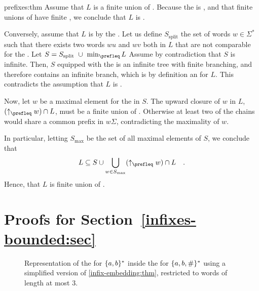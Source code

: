 \begin{proofof}{prefixes:thm}
    Assume that $L$ is a finite union of .
    Because the  is ,
    and that finite unions of  have finite ,
    we conclude that $L$ is .
    
    Conversely, assume that $L$ is  by the . Let us define $S_{\mathrm{split}}$ the set of words $w \in \Sigma^*$ 
    such that there exists
    two words $wu$ and $wv$ both in $L$ that are not comparable for the
    . Let $S = S_{\mathrm{split}}~\cup~\min_{\prefleq} L$
    Assume by contradiction that $S$ is infinite.
    Then, $S$ equipped with the  is an infinite
    tree with finite branching, and therefore contains an infinite
    branch, which is by definition an  for $L$.
    This contradicts the assumption that $L$ is .
    
    Now, let $w$ be a maximal element for the 
    in $S$. 
    The upward closure of $w$ in $L$, $(\upset[\prefleq]{w}) \cap L$, must be a 
    finite union of . Otherwise at least two of the chains would share a common 
    prefix in $w\Sigma$, contradicting the maximality of $w$.
    
    In particular, letting $S_{\max}$ be the set of all maximal elements
    of $S$,
    we conclude that 
    \begin{equation*}
        L \subseteq S \cup \bigcup_{w \in S_{\max}} (\upset[\prefleq]{w}) \cap L
        \quad .
    \end{equation*}
    Hence, that $L$ is finite union of .
\end{proofof}


\clearpage
\section{Proofs for Section~\ref{infixes-bounded:sec}}

\begin{figure}
    \centering
    
    \caption{Representation of the  for $\{ a,b \}^*$
        inside the  for $\{ a,b,\# \}^*$
        using a simplified version of \cref{infix-embedding:thm}, restricted to words
        of length at most $3$. 
    }
    \label{infix-embedding:fig}
\end{figure}


